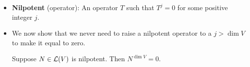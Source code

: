 \documentclass[../main.tex]{subfiles}
\begin{document}
\begin{itemize}
\begin{theorem}
\begin{proof}
\begin{align*}
\begin{split}
                    &+ a_{j+1}(T-\lambda_jI)^k\prod_{\substack{i=1\\i\neq j}}^m(T-\lambda_iI)^nv_{j+1}+\cdots+a_m(T-\lambda_jI)^k\prod_{\substack{i=1\\i\neq j}}^m(T-\lambda_iI)^nv_m
                \end{split}\\
                \begin{split}
                    ={}& a_1(T-\lambda_jI)^k\left( \prod_{\substack{i=1\\i\neq j,1}}^m(T-\lambda_iI)^n \right)(T-\lambda_1I)^nv_1\\
                    &+ \cdots+a_{j-1}(T-\lambda_jI)^k\left( \prod_{\substack{i=1\\i\neq j,j-1}}^m(T-\lambda_iI)^n \right)(T-\lambda_{j-1}I)^nv_{j-1}\\
                    &+ a_j\left( \prod_{\substack{i=1\\i\neq j}}^m(T-\lambda_iI)^n \right)(T-\lambda_jI)^kv_j\\
                    &+ a_{j+1}(T-\lambda_jI)^k\left( \prod_{\substack{i=1\\i\neq j,j+1}}^m(T-\lambda_iI)^n \right)(T-\lambda_{j+1}I)^nv_{j+1}\\
                    &+ \cdots+a_m(T-\lambda_jI)^k\left( \prod_{\substack{i=1\\i\neq j,m}}^m(T-\lambda_iI)^n \right)(T-\lambda_mI)^nv_m
                \end{split}\tag*{Theorem \ref{trm:polTMultiplicative}}\\
                ={}& a_j\prod_{\substack{i=1\\i\neq j}}^m(T-\lambda_iI)^nw\tag*{Theorem \ref{trm:generalizedEigenspaces}}\\
                ={}& a_j\prod_{\substack{i=1\\i\neq j}}^m(\lambda_j-\lambda_i)^nw
            \end{align*}
            \endgroup
            so $a_j=0$, as desired.
        \end{proof}
    \end{theorem}
    \item \textbf{Nilpotent} (operator): An operator $T$ such that $T^j=0$ for some positive integer $j$.
    \item We now show that we never need to raise a nilpotent operator to a $j>\dim V$ to make it equal to zero.
    \begin{theorem}\label{trm:NtothedimV}
        Suppose $N\in\mathcal{L}(V)$ is nilpotent. Then $N^{\dim V}=0$.

\end{theorem}
\end{itemize}
\end{document}
